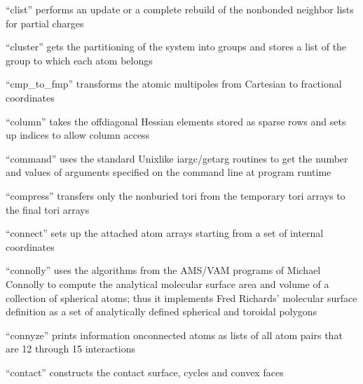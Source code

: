 \documentclass[letterpaper,11pt,english]{sphinxmanual}
\begin{document}


“clist” performs an update or a complete rebuild of the
nonbonded neighbor lists for partial charges


“cluster” gets the partitioning of the system into groups
and stores a list of the group to which each atom belongs


“cmp\_to\_fmp” transforms the atomic multipoles from Cartesian
to fractional coordinates


“column” takes the off\sphinxhyphen{}diagonal Hessian elements stored
as sparse rows and sets up indices to allow column access


“command” uses the standard Unix\sphinxhyphen{}like iargc/getarg routines
to get the number and values of arguments specified on the
command line at program runtime


“compress” transfers only the non\sphinxhyphen{}buried tori from
the temporary tori arrays to the final tori arrays


“connect” sets up the attached atom arrays
starting from a set of internal coordinates


“connolly” uses the algorithms from the AMS/VAM programs of
Michael Connolly to compute the analytical molecular surface
area and volume of a collection of spherical atoms; thus
it implements Fred Richards’ molecular surface definition as
a set of analytically defined spherical and toroidal polygons


“connyze” prints information onconnected atoms as lists
of all atom pairs that are 1\sphinxhyphen{}2 through 1\sphinxhyphen{}5 interactions


“contact” constructs the contact surface, cycles and convex faces
\end{document}
